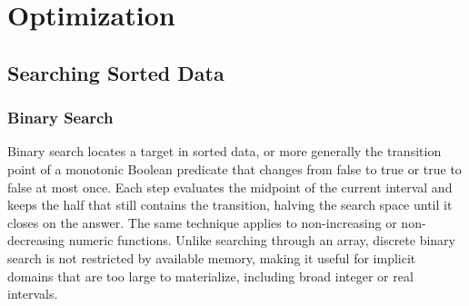 \chapter{\texorpdfstring{Optimization}{5. Optimization}}

\section{\texorpdfstring{Searching Sorted Data}{5.1 Searching Sorted Data}}
\setcounter{section}{1}
\setcounter{subsection}{0}
\subsection{Binary Search}
\label{sec:5.1.1}
Binary search locates a target in sorted data, or more generally the transition point of a monotonic Boolean predicate that changes from false to true or true to false at most once. Each step evaluates the midpoint of the current interval and keeps the half that still contains the transition, halving the search space until it closes on the answer. The same technique applies to non-increasing or non-decreasing numeric functions. Unlike searching through an array, discrete binary search is not restricted by available memory, making it useful for implicit domains that are too large to materialize, including broad integer or real intervals.

